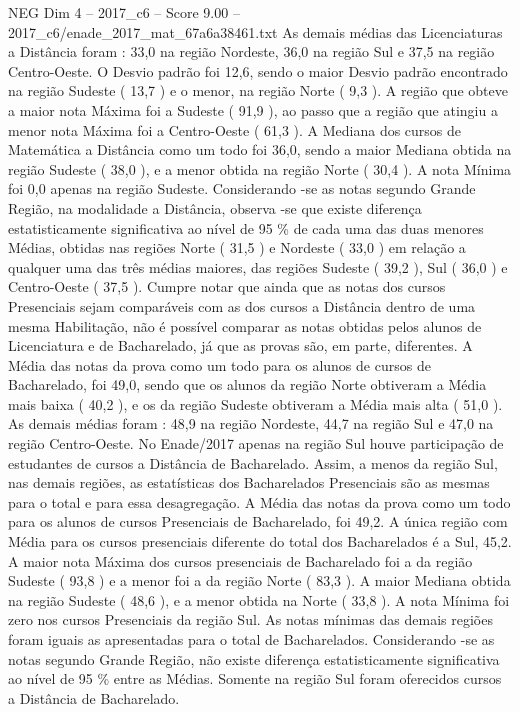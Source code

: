 \begin{textsample}{NEG Dim 4 – 2017\_c6 – Score 9.00 – 2017\_c6/enade\_2017\_mat\_67a6a38461.txt}
As demais médias das Licenciaturas a Distância foram : 33,0 na região Nordeste, 36,0 na região Sul e 37,5 na região Centro-Oeste.
O Desvio padrão foi 12,6, sendo o maior Desvio padrão encontrado na região Sudeste ( 13,7 ) e o menor, na região Norte ( 9,3 ).
A região que obteve a maior nota Máxima foi a Sudeste ( 91,9 ), ao passo que a região que atingiu a menor nota Máxima foi a Centro-Oeste ( 61,3 ).
A Mediana dos cursos de Matemática a Distância como um todo foi 36,0, sendo a maior Mediana obtida na região Sudeste ( 38,0 ), e a menor obtida na região Norte ( 30,4 ).
A nota Mínima foi 0,0 apenas na região Sudeste.
Considerando -se as notas segundo Grande Região, na modalidade a Distância, observa -se que existe diferença estatisticamente significativa ao nível de 95 \% de cada uma das duas menores Médias, obtidas nas regiões Norte ( 31,5 ) e Nordeste ( 33,0 ) em relação a qualquer uma das três médias maiores, das regiões Sudeste ( 39,2 ), Sul ( 36,0 ) e Centro-Oeste ( 37,5 ).
Cumpre notar que ainda que as notas dos cursos Presenciais sejam comparáveis com as dos cursos a Distância dentro de uma mesma Habilitação, não é possível comparar as notas obtidas pelos alunos de Licenciatura e de Bacharelado, já que as provas são, em parte, diferentes.
A Média das notas da prova como um todo para os alunos de cursos de Bacharelado, foi 49,0, sendo que os alunos da região Norte obtiveram a Média mais baixa ( 40,2 ), e os da região Sudeste obtiveram a Média mais alta ( 51,0 ).
As demais médias foram : 48,9 na região Nordeste, 44,7 na região Sul e 47,0 na região Centro-Oeste.
No Enade/2017 apenas na região Sul houve participação de estudantes de cursos a Distância de Bacharelado.
Assim, a menos da região Sul, nas demais regiões, as estatísticas dos Bacharelados Presenciais são as mesmas para o total e para essa desagregação.
A Média das notas da prova como um todo para os alunos de cursos Presenciais de Bacharelado, foi 49,2.
A única região com Média para os cursos presenciais diferente do total dos Bacharelados é a Sul, 45,2.
A maior nota Máxima dos cursos presenciais de Bacharelado foi a da região Sudeste ( 93,8 ) e a menor foi a da região Norte ( 83,3 ).
A maior Mediana obtida na região Sudeste ( 48,6 ), e a menor obtida na Norte ( 33,8 ).
A nota Mínima foi zero nos cursos Presenciais da região Sul.
As notas mínimas das demais regiões foram iguais as apresentadas para o total de Bacharelados.
Considerando -se as notas segundo Grande Região, não existe diferença estatisticamente significativa ao nível de 95 \% entre as Médias.
Somente na região Sul foram oferecidos cursos a Distância de Bacharelado.

\end{textsample}
